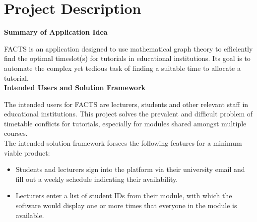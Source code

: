 \section{Project Description}

\textbf{Summary of Application Idea}\par
FACTS is an application designed to use mathematical graph theory to efficiently find the optimal timeslot(s) for tutorials in educational institutions. 
Its goal is to automate the complex yet tedious task of finding a suitable time to allocate a tutorial.\\

\textbf{Intended Users and Solution Framework}\par
The intended users for FACTS are lecturers, students and other relevant staff in educational institutions. This project solves the prevalent and difficult 
problem of timetable conflicts for tutorials, especially for modules shared amongst multiple courses.
\\The intended solution framework forsees the following features for a minimum viable product:

\begin{itemize}
\item Students and lecturers sign into the platform via their university email and fill out a weekly schedule indicating their availability.
\item Lecturers enter a list of student IDs from their module, with which the software would display one or more times that everyone in the module is available.
\end{itemize}
